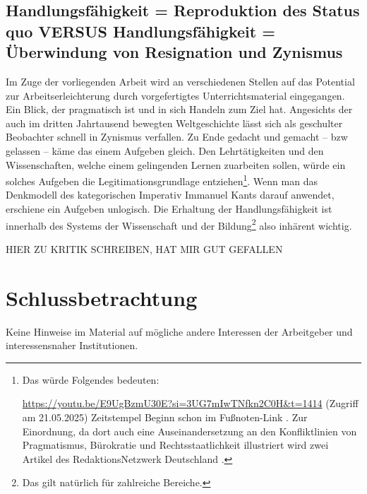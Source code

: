 

\subsection{Handlungsfähigkeit = Reproduktion des Status quo VERSUS Handlungsfähigkeit = Überwindung von Resignation und Zynismus}
Im Zuge der vorliegenden Arbeit wird an verschiedenen Stellen auf das Potential zur Arbeitserleichterung durch vorgefertigtes Unterrichtsmaterial eingegangen. Ein Blick, der pragmatisch ist und in sich Handeln zum Ziel hat. Angesichts der auch im dritten Jahrtausend bewegten Weltgeschichte lässt sich als geschulter Beobachter schnell in Zynismus verfallen. Zu Ende gedacht und gemacht -- \gls{bzw} gelassen -- käme das einem Aufgeben gleich. Den Lehrtätigkeiten und den Wissenschaften, welche einem gelingenden Lernen zuarbeiten sollen, würde ein solches Aufgeben die Legitimationsgrundlage entziehen\footnote{
    Das würde Folgendes bedeuten: 

    \url{https://youtu.be/E9UgBzmU30E?si=3UG7mIwTNfkn2C0H&t=1414} (Zugriff am 21.05.2025) Zeitstempel Beginn schon im Fußnoten-Link \autocite[][Als Meme von $23^{\prime}34^{\prime\prime}$ bis $23^{\prime}50^{\prime\prime}$ schauen]{Wolle}. Zur Einordnung, da dort auch %
    eine Auseinandersetzung an den Konfliktlinien von Pragmatismus, Bürokratie und Rechtsstaatlichkeit illustriert wird zwei Artikel des RedaktionsNetzwerk Deutschland \autocites{Schwarzer.05.02.2021}{Schwarzer.08.02.2021}.
}. Wenn man das Denkmodell des kategorischen Imperativ Immanuel Kants darauf anwendet, erschiene ein Aufgeben unlogisch. Die Erhaltung der Handlungsfähigkeit ist innerhalb des Systems der Wissenschaft und der Bildung\footnote{
    Das gilt natürlich für zahlreiche Bereiche. 
} also inhärent wichtig. 


HIER ZU  KRITIK SCHREIBEN, HAT MIR GUT GEFALLEN
\autocite[]{Roler2016}

\section{Schlussbetrachtung}
Keine Hinweise im Material auf mögliche andere Interessen der Arbeitgeber und interessensnaher Institutionen.


